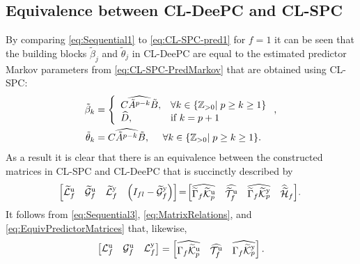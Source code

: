 \subsection{Equivalence between \ac{CL-DeePC} and \ac{CL-SPC}}
By comparing \eqref{eq:Sequential1} to \eqref{eq:CL-SPC-pred1} for $f=1$ it can be seen that the building blocks $\tilde{\beta}_j$ and $\tilde{\theta}_j$ in \ac{CL-DeePC} are equal to the estimated predictor Markov parameters from \eqref{eq:CL-SPC-PredMarkov} that are obtained using \ac{CL-SPC}:
\begin{subequations}\label{eq:EquivMarkov}
	\begin{align}
		\tilde{\beta}_k &= \left\{\begin{array}{ll}
			\widehat{C\tilde{A}^{p-k}\tilde{B}}, &\forall k\in\{\mathbb{Z}_{>0}|\;p \geq k \geq 1\}\\
			\widehat{D}, &\text{if } k=p+1
		\end{array}\right.,\label{eq:EquivMarkovInputs}\\
	\tilde{\theta}_k &= \widehat{C\tilde{A}^{p-k}\tilde{B}},\mkern24mu \forall k\in\{\mathbb{Z}_{>0}|\;p \geq k \geq 1\}\label{eq:EquivMarkovOutputs}.
	\end{align}
\end{subequations}
As a result it is clear that there is an equivalence between the constructed matrices in \ac{CL-SPC} and \ac{CL-DeePC} that is succinctly described by
\begin{align}\label{eq:EquivPredictorMatrices}
	\mkern-3mu\begin{bmatrix}
		\widetilde{\mathcal{L}}^\mathrm{u}_f & \widetilde{\mathcal{G}}^\mathrm{u}_f & \widetilde{\mathcal{L}}^\mathrm{y}_f & \left(I_{fl}-\widetilde{\mathcal{G}}^\mathrm{y}_f\right)
	\end{bmatrix}\mkern-3mu=\mkern-3mu\begin{bmatrix}
		\widehat{\widetilde{\Gamma}_f\widetilde{\mathcal{K}}_{p}^{\mathrm{{u}}}} & \widehat{\widetilde{\mathcal{T}}_f^\mathrm{u}} & \widehat{\widetilde{\Gamma}_f\widetilde{\mathcal{K}}_{p}^{\mathrm{{y}}}} & \widehat{\widetilde{\mathcal{H}}}_f
	\end{bmatrix}\mkern-3mu.
\end{align}
It follows from \eqref{eq:Sequential3}, \eqref{eq:MatrixRelations}, and \eqref{eq:EquivPredictorMatrices} that, likewise,
\begin{align}\label{eq:EquivInnovationMatrices}
	\begin{bmatrix}
		\mathcal{L}^\mathrm{u}_f & \mathcal{G}^\mathrm{u}_f & \mathcal{L}^\mathrm{y}_f
	\end{bmatrix}=\begin{bmatrix}
		\widehat{\Gamma_f\widetilde{\mathcal{K}}_{p}^{\mathrm{{u}}}} & \widehat{\mathcal{T}_f^\mathrm{u}} & \widehat{\Gamma_f\widetilde{\mathcal{K}}_{p}^{\mathrm{{y}}}}
	\end{bmatrix}.
\end{align}
